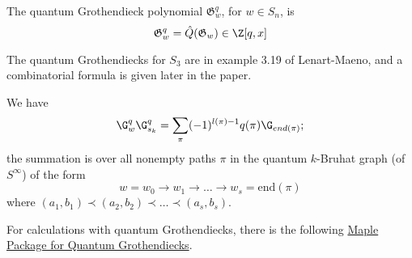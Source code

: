 \begin{definition}
    The quantum Grothendieck polynomial $\mathfrak{G}_w^q$, for $w \in S_n$, is
    \begin{equation*}
        \mathfrak{G}_w^q = \hat{Q}(\mathfrak{G}_w) \in \Z[q,x]
    \end{equation*}
\end{definition}
The quantum Grothendiecks for $S_3$ are in example 3.19 of Lenart-Maeno, and a combinatorial formula is given later in the paper. \\

\begin{theorem}

We have
\begin{equation*}
    \G_w^q \G_{s_k}^q = \sum_\pi (-1)^{l(\pi)- 1}q(\pi) \G_{end(\pi)} ; 
\end{equation*}
the summation is over all nonempty paths $\pi$ in the quantum $k$-Bruhat graph (of $S^\infty$) of the form 
\begin{equation*}
    w = w_0 \rightarrow w_1 \rightarrow \ldots \rightarrow w_s = \text{end}(\pi)
\end{equation*}
where $(a_1, b_1) \prec (a_2,b_2) \prec \ldots \prec (a_s,b_s)$.
\end{theorem}

For calculations with quantum Grothendiecks, there is the following \href{https://ow3.math.rutgers.edu/~asbuch/equivcalc/}{Maple Package for Quantum Grothendiecks}.



